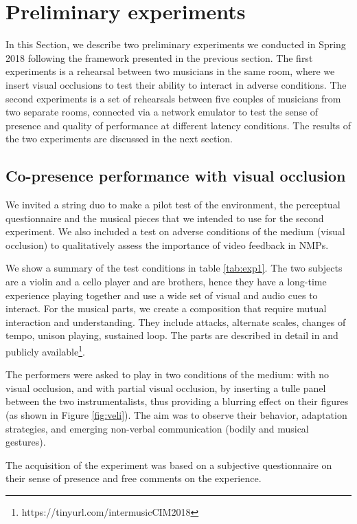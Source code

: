 \section{Preliminary experiments}\label{sec:setup}
In this Section, we describe two preliminary experiments we conducted in Spring 2018 following the framework presented in the previous section. The first experiments is a rehearsal between two musicians in the same room, where we insert visual occlusions to test their ability to interact in adverse conditions. The second experiments is a set of rehearsals between five couples of musicians from two separate rooms, connected via a network emulator to test the sense of presence and quality of performance at different latency conditions. The results of the two experiments are discussed in the next section.


\subsection{Co-presence performance with visual occlusion}
We invited a string duo to make a pilot test of the environment, the perceptual questionnaire and the musical pieces that we intended to use for the second experiment. We also included a test on adverse conditions of the medium (visual occlusion) to qualitatively assess the importance of video feedback in NMPs.

We show a summary of the test conditions in table \ref{tab:exp1}. The two subjects are a violin and a cello player and are brothers, hence they have a long-time experience playing together and use a wide set of visual and audio cues to interact. For the musical parts, we create a composition that require mutual interaction and understanding. They include attacks, alternate scales, changes of tempo, unison playing, sustained loop. The parts are described in detail in \cite{CIM2018} and publicly available\footnote{https://tinyurl.com/intermusicCIM2018}.

The performers were asked to play in two conditions of the medium: with no visual occlusion, and with partial visual occlusion, by inserting a tulle panel between the two instrumentalists, thus providing a blurring effect on their figures (as shown in Figure \ref{fig:veli}). The aim was to observe their behavior, adaptation strategies, and emerging non-verbal communication (bodily and musical gestures).

The acquisition of the experiment was based on a subjective questionnaire on their sense of presence and free comments on the experience. 



